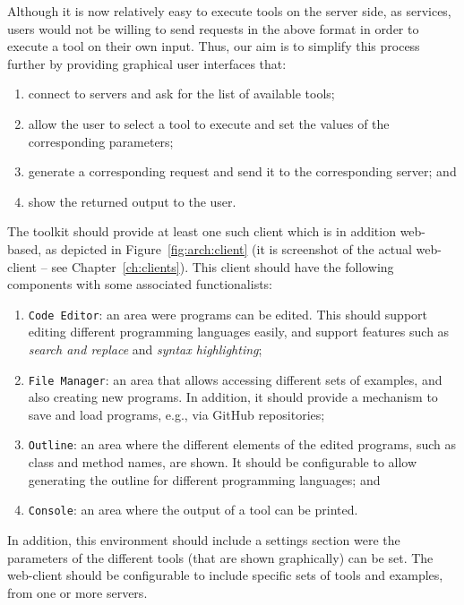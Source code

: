 Although it is now relatively easy to execute tools on the server
side, as services, users would not be willing to send requests in the
above format in order to execute a tool on their own input. Thus, our
aim is to simplify this process further by providing graphical user
interfaces that:
%
\begin{enumerate}
%
\item connect to \ei servers and ask for the list of available tools;
%
\item allow the user to select a tool to execute and set the values of
  the corresponding parameters;
%
\item generate a corresponding request and send it to the
  corresponding \ei server; and
%
\item show the returned output to the user.
\end{enumerate}
%
The \ei toolkit should provide at least one such client which is in
addition web-based, as depicted in Figure~\ref{fig:arch:client} (it is
screenshot of the actual \ei web-client -- see
Chapter~\ref{ch:clients}).
%
This client should have the following components with some associated
functionalists:
%
\begin{enumerate}
%
\item \texttt{Code Editor}: an area were programs can be edited. This
  should support editing different programming languages easily, and
  support features such as \emph{search and replace} and \emph{syntax
    highlighting};
%
\item \texttt{File Manager}: an area that allows accessing different
  sets of examples, and also creating new programs. In addition, it
  should provide a mechanism to save and load programs, e.g., via
  GitHub repositories;
%
\item \texttt{Outline}: an area where the different elements of the
  edited programs, such as class and method names, are shown. It
  should be configurable to allow generating the outline for different
  programming languages; and
%
\item \texttt{Console}: an area where the output of a tool can be
  printed.
%
\end{enumerate}
%
In addition, this environment should include a settings section were
the parameters of the different tools (that are shown graphically) can
be set. The web-client should be configurable to include specific sets
of tools and examples, from one or more \ei servers.

